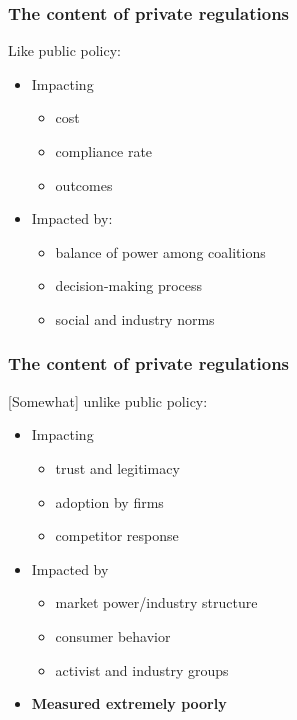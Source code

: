 \documentclass[10pt]{beamer}
\begin{document}
\begin{frame}
\frametitle{The content of private regulations}
Like public policy: \begin{itemize}
  \item Impacting \begin{itemize}
    \item cost
    \item compliance rate
    \item outcomes \end{itemize} \pause
  \item Impacted by: \begin{itemize}
    \item balance of power among coalitions
    \item decision-making process 
    \item social and industry norms \end{itemize}
\end{itemize}

\end{frame}

\begin{frame}
\frametitle{The content of private regulations}
[Somewhat] unlike public policy: \begin{itemize}
	\item Impacting \begin{itemize}
      \item trust and legitimacy
      \item adoption by firms
      \item competitor response \end{itemize} \pause
	\item Impacted by \begin{itemize}
		\item market power/industry structure
        \item consumer behavior 
        \item activist and industry groups
	\end{itemize} \pause
    \item \textbf{Measured extremely poorly}
\end{itemize}
\end{frame}
\end{document}
